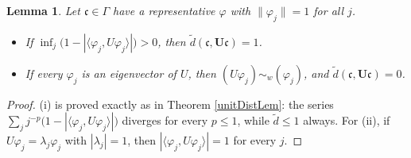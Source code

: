 \documentclass[twoside,11pt,letter]{article}
\def\fc{{\mathfrak{c}}}
\theoremstyle{definition}
\theoremstyle{definition}
\theoremstyle{plain}
\newtheorem{lemma}[theorem]{Lemma}
\begin{document}
\begin{lemma}\label{tildeDistLem}
Let $\fc\in\Gamma$ have a representative $\varphi$ with $\|\varphi_j\|=1$ for all $j$.
\begin{itemize}
\item[(i)]{If $\inf_j\big(1-|\langle \varphi_j,U\varphi_j\rangle|\big)>0$, then $\tilde d(\fc,\mathbf{U}\fc)=1$.}
\item[(ii)]{If every $\varphi_j$ is an eigenvector of $U$, then $(U\varphi_j)\sim_w(\varphi_j)$, and $\tilde d(\fc,\mathbf{U}\fc)=0$.}
\end{itemize}
\end{lemma}
\begin{proof}
(i) is proved exactly as in Theorem \ref{unitDistLem}: the series $\sum_j j^{-p}\big(1-|\langle\varphi_j,U\varphi_j\rangle|\big)$ diverges for every $p\leq1$, while $\tilde d\leq1$ always. For (ii), if $U\varphi_j=\lambda_j\varphi_j$ with $|\lambda_j|=1$, then $|\langle\varphi_j,U\varphi_j\rangle|=1$ for every $j$.
\end{proof}
\end{document}

